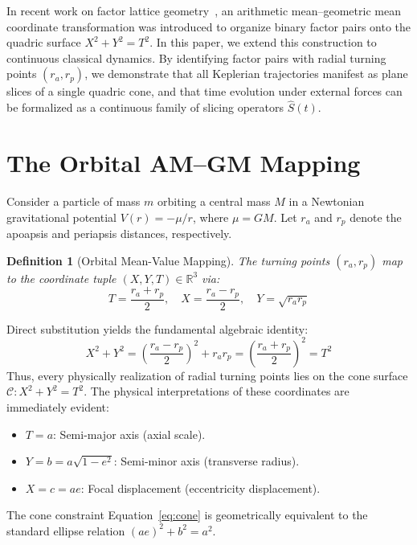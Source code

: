 \documentclass[11pt,3p,twocolumn]{elsarticle}
\newtheorem{definition}{Definition}
\begin{document}
In recent work on factor lattice geometry~\cite{Ebert2026}, an arithmetic mean--geometric mean coordinate transformation was introduced to organize binary factor pairs onto the quadric surface $X^2 + Y^2 = T^2$. In this paper, we extend this construction to continuous classical dynamics. By identifying factor pairs with radial turning points $(r_a, r_p)$, we demonstrate that all Keplerian trajectories manifest as plane slices of a single quadric cone, and that time evolution under external forces can be formalized as a continuous family of slicing operators $\hat{S}(t)$.

\section{The Orbital AM--GM Mapping}

Consider a particle of mass $m$ orbiting a central mass $M$ in a Newtonian gravitational potential $V(r) = -\mu/r$, where $\mu = GM$. Let $r_a$ and $r_p$ denote the apoapsis and periapsis distances, respectively.

\begin{definition}[Orbital Mean-Value Mapping]
The turning points $(r_a, r_p)$ map to the coordinate tuple $(X, Y, T) \in \mathbb{R}^3$ via:
\begin{equation}
T = \frac{r_a + r_p}{2}, \quad X = \frac{r_a - r_p}{2}, \quad Y = \sqrt{r_a r_p}
\end{equation}
\end{definition}

Direct substitution yields the fundamental algebraic identity:
\begin{equation}
X^2 + Y^2 = \left(\frac{r_a - r_p}{2}\right)^2 + r_a r_p = \left(\frac{r_a + r_p}{2}\right)^2 = T^2
\label{eq:cone}
\end{equation}
Thus, every physically realization of radial turning points lies on the cone surface $\mathcal{C}: X^2 + Y^2 = T^2$. The physical interpretations of these coordinates are immediately evident:
\begin{itemize}
    \item $T = a$: Semi-major axis (axial scale).
    \item $Y = b = a\sqrt{1-e^2}$: Semi-minor axis (transverse radius).
    \item $X = c = ae$: Focal displacement (eccentricity displacement).
\end{itemize}
The cone constraint Equation~\eqref{eq:cone} is geometrically equivalent to the standard ellipse relation $(ae)^2 + b^2 = a^2$.
\end{document}
